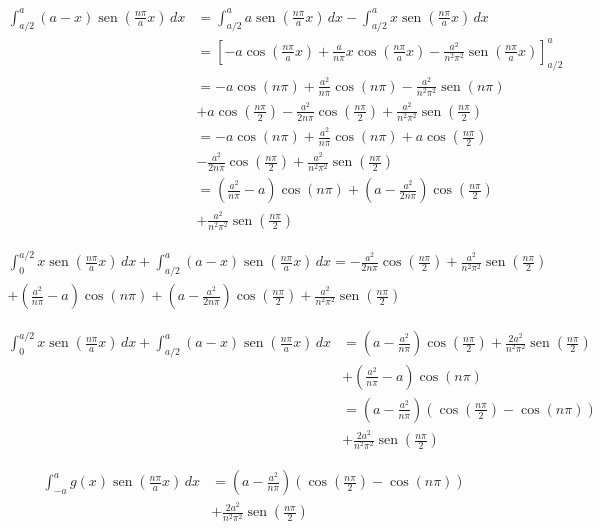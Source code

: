 \documentclass[12pt, a4paper, portuguese]{fphw}
\DeclareMathOperator{\sen}{sen}
\begin{document}
$$
\begin{aligned}
\int_{a/2}^{a} \left( a - x \right) \sen \left( \frac{n \pi}{a} x \right)\, dx &= \int_{a/2}^{a} a \sen \left( \frac{n \pi}{a} x \right)\, dx - \int_{a/2}^{a} x \sen \left( \frac{n \pi}{a} x \right)\, dx \\
&=
\left[
-a \cos \left( \frac{n \pi}{a} x \right)
+\frac{a}{n \pi}x
\cos \left( \frac{n\pi}{a}x \right)
-
\frac{a^2}{n^2 \pi^2}
\sen \left( \frac{n\pi}{a}x \right)
\right]_{a/2}^a \\
&=
-a \cos \left( n \pi \right)
+\frac{a^2}{n \pi}
\cos \left( n\pi \right)
-
\frac{a^2}{n^2 \pi^2}
\sen \left( n\pi \right) \\
&+
a \cos \left( \frac{n \pi}{2} \right)
-\frac{a^2}{2n \pi}
\cos \left( \frac{n\pi}{2} \right)
+
\frac{a^2}{n^2 \pi^2}
\sen \left( \frac{n\pi}{2} \right) \\
&=
-a \cos \left( n \pi \right)
+\frac{a^2}{n \pi}
\cos \left( n\pi \right)
+ a \cos \left( \frac{n \pi}{2} \right) \\
&-\frac{a^2}{2n \pi}
\cos \left( \frac{n\pi}{2} \right)
+
\frac{a^2}{n^2 \pi^2}
\sen \left( \frac{n\pi}{2} \right) \\
&=
\left(
\frac{a^2}{n \pi} - a
\right)
\cos \left( n \pi \right)
+
\left(
a -\frac{a^2}{2n \pi}
\right)
\cos \left( \frac{n \pi}{2} \right) \\
&+
\frac{a^2}{n^2 \pi^2}
\sen \left( \frac{n\pi}{2} \right)
\end{aligned}
$$

$$
\begin{aligned}
\int_{0}^{a/2} x \sen \left( \frac{n \pi}{a} x \right)\, dx + \int_{a/2}^{a} \left( a - x \right) \sen \left( \frac{n \pi}{a} x \right)\, dx
= 
-\frac{a^2}{2n \pi}
\cos \left( \frac{n\pi}{2} \right)
+
\frac{a^2}{n^2 \pi^2}
\sen \left( \frac{n\pi}{2} \right) \\
+
\left(
\frac{a^2}{n \pi} - a
\right)
\cos \left( n \pi \right)
+
\left(
a -\frac{a^2}{2n \pi}
\right)
\cos \left( \frac{n \pi}{2} \right)
+
\frac{a^2}{n^2 \pi^2}
\sen \left( \frac{n\pi}{2} \right)
\end{aligned}
$$

$$
\begin{aligned}
\int_{0}^{a/2} x \sen \left( \frac{n \pi}{a} x \right)\, dx + \int_{a/2}^{a} \left( a - x \right) \sen \left( \frac{n \pi}{a} x \right)\, dx
&=
\left(
a -\frac{a^2}{n \pi}
\right)
\cos \left( \frac{n\pi}{2} \right)
+
\frac{2a^2}{n^2 \pi^2}
\sen \left( \frac{n\pi}{2} \right) \\
&+
\left(
\frac{a^2}{n \pi} - a
\right)
\cos \left( n \pi \right) \\
&=
\left(
a -\frac{a^2}{n \pi}
\right)
\left(
\cos \left( \frac{n\pi}{2} \right)
-
\cos \left( n \pi \right)
\right) \\
&+
\frac{2a^2}{n^2 \pi^2}
\sen \left( \frac{n\pi}{2} \right)
\end{aligned}
$$

$$
\begin{aligned}
\int_{-a}^{a} g(x) \sen \left( \frac{n \pi}{a} x \right)\, dx &= 
\left(
a -\frac{a^2}{n \pi}
\right)
\left(
\cos \left( \frac{n\pi}{2} \right)
-
\cos \left( n \pi \right)
\right) \\
&+
\frac{2a^2}{n^2 \pi^2}
\sen \left( \frac{n\pi}{2} \right)
\end{aligned}
$$
\end{document}
